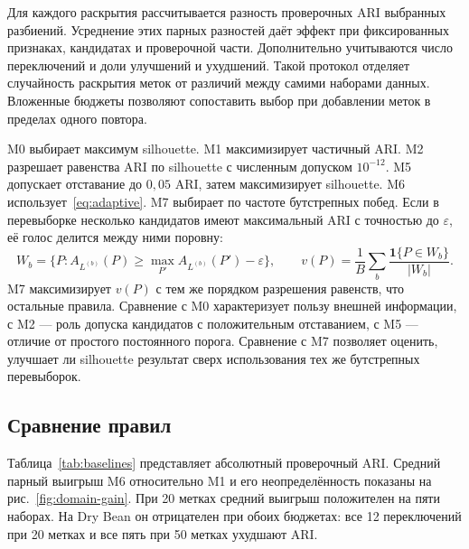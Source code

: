 Для каждого раскрытия рассчитывается разность проверочных ARI выбранных разбиений. Усреднение этих парных разностей даёт эффект при фиксированных признаках, кандидатах и проверочной части. Дополнительно учитываются число переключений и доли улучшений и ухудшений. Такой протокол отделяет случайность раскрытия меток от различий между самими наборами данных. Вложенные бюджеты позволяют сопоставить выбор при добавлении меток в пределах одного повтора.

M0 выбирает максимум silhouette. M1 максимизирует частичный ARI. M2 разрешает равенства ARI по silhouette с численным допуском $10^{-12}$. M5 допускает отставание до $0{,}05$ ARI, затем максимизирует silhouette. M6 использует~\eqref{eq:adaptive}. M7 выбирает по частоте бутстрепных побед. Если в перевыборке несколько кандидатов имеют максимальный ARI с точностью до $\varepsilon$, её голос делится между ними поровну:
\begin{equation}\label{eq:bootstrap-votes}
 W_b=\{P:A_{L^{(b)}}(P)\ge\max_{P'}A_{L^{(b)}}(P')-\varepsilon\},\qquad
 v(P)=\frac1B\sum_b\frac{\mathbf1\{P\in W_b\}}{|W_b|}.
\end{equation}
M7 максимизирует $v(P)$ с тем же порядком разрешения равенств, что остальные правила. Сравнение с M0 характеризует пользу внешней информации, с M2 --- роль допуска кандидатов с положительным отставанием, с M5 --- отличие от простого постоянного порога. Сравнение с M7 позволяет оценить, улучшает ли silhouette результат сверх использования тех же бутстрепных перевыборок.

\subsection{Сравнение правил}
Таблица~\ref{tab:baselines} представляет абсолютный проверочный ARI. Средний парный выигрыш M6 относительно M1 и его неопределённость показаны на рис.~\ref{fig:domain-gain}. При 20 метках средний выигрыш положителен на пяти наборах. На Dry Bean он отрицателен при обоих бюджетах: все 12 переключений при 20 метках и все пять при 50 метках ухудшают ARI.


